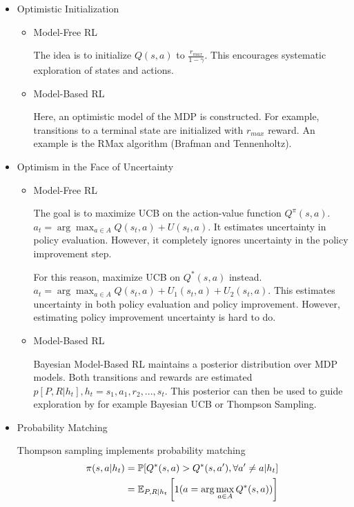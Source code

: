 \begin{itemize}
	\item Optimistic Initialization
	\begin{itemize}
		\item Model-Free RL
		
		The idea is to initialize $Q(s, a)$ to $\frac{r_{max}}{1 - \gamma}$. This encourages systematic exploration of states and actions.
		\item Model-Based RL
		
		Here, an optimistic model of the MDP is constructed. For example, transitions to a terminal state are initialized with $r_{max}$ reward. An example is the RMax algorithm (Brafman and Tennenholtz).
	\end{itemize}

	\item Optimism in the Face of Uncertainty
		\begin{itemize}
		\item Model-Free RL
		
		The goal is to maximize UCB on the action-value function $Q^\pi(s, a)$. $a_t = \arg\max_{a \in A} Q(s_t, a) + U(s_t, a)$. It estimates uncertainty in policy evaluation. However, it completely ignores uncertainty in the policy improvement step.
		
		For this reason, maximize UCB on $Q^*(s, a)$ instead. $a_t = \arg\max_{a \in A} Q(s_t, a) + U_1(s_t, a) + U_2(s_t, a)$. This estimates uncertainty in both policy evaluation and policy improvement. However, estimating policy improvement uncertainty is hard to do.		
		
 		\item Model-Based RL
		
		Bayesian Model-Based RL maintains a posterior distribution over MDP models. Both transitions and rewards are estimated $p[P, R| h_t], h_t = s_1, a_1, r_2, ..., s_t$. This posterior can then be used to guide exploration by for example Bayesian UCB or Thompson Sampling.
	\end{itemize}

	\item Probability Matching
	
	Thompson sampling implements probability matching
	\begin{equation*}
		\begin{aligned}
			\pi(s, a | h_t) & = \operatorname{\mathbb{P}}[Q^*(s, a) > Q^*(s, a'), \forall a' \neq a | h_t]\\
							& = \operatorname{\mathbb{E}}_{P, R| h_t}\left[1(a = \arg\max_{a \in A} Q^*(s, a))\right]
		\end{aligned}
	\end{equation*}


\end{itemize}
